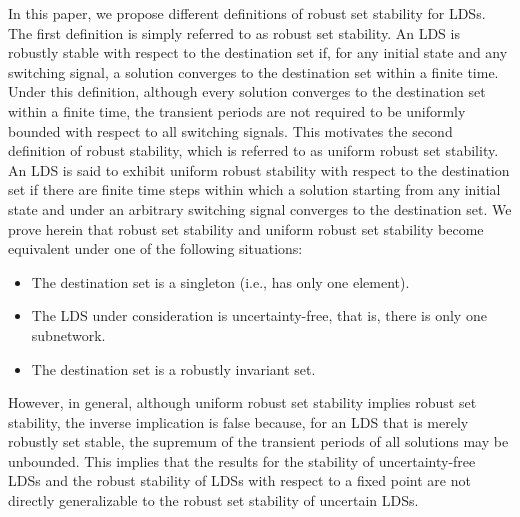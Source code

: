 \documentclass[11pt,onecolumn]{article}
\begin{document}
In this paper, we propose different definitions of robust set stability for LDSs. The first definition is simply referred to as robust set stability. An LDS is robustly stable with respect to the destination set if, for any initial state and any switching signal, a solution converges to the destination set within a finite time. Under this definition, although every solution converges to the destination set within a finite time, the transient periods are not required to be uniformly bounded with respect to all switching signals. This motivates the second definition of robust stability, which is referred to as uniform robust set stability. An LDS is said to exhibit uniform robust stability with respect to the destination set if there are finite time steps within which a solution starting from any initial state and under an arbitrary switching signal converges to the destination set. We prove herein that robust set stability and uniform robust set stability become equivalent under one of the following situations:
 \begin{itemize}
   \item The destination set is a singleton (i.e., has only one element).
   \item The LDS under consideration is uncertainty-free, that is, there is only one subnetwork.
   \item The destination set is a robustly invariant set.
 \end{itemize}
However, in general, although uniform robust set stability implies robust set stability, the inverse implication is false because, for an LDS that is merely robustly set stable, the supremum of the transient periods of all solutions may be unbounded. This implies that the results for the stability of uncertainty-free LDSs and the robust stability of LDSs with respect to a fixed point are not directly generalizable to the robust set stability of uncertain LDSs.
\end{document}
